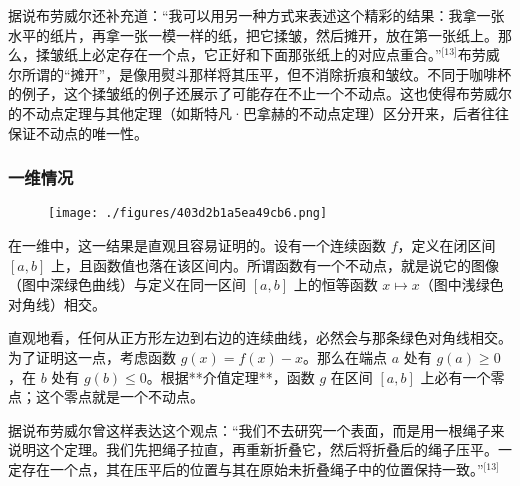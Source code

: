 据说布劳威尔还补充道：“我可以用另一种方式来表述这个精彩的结果：我拿一张水平的纸片，再拿一张一模一样的纸，把它揉皱，然后摊开，放在第一张纸上。那么，揉皱纸上必定存在一个点，它正好和下面那张纸上的对应点重合。”\(^\text{[13]}\)布劳威尔所谓的“摊开”，是像用熨斗那样将其压平，但不消除折痕和皱纹。不同于咖啡杯的例子，这个揉皱纸的例子还展示了可能存在不止一个不动点。这也使得布劳威尔的不动点定理与其他定理（如斯特凡·巴拿赫的不动点定理）区分开来，后者往往保证不动点的唯一性。
\subsubsection{一维情况}
\begin{figure}[ht]
\centering
\texttt{[image: ./figures/403d2b1a5ea49cb6.png]}
\caption{} \label{fig_BLWRbd_1}
\end{figure}
在一维中，这一结果是直观且容易证明的。设有一个连续函数 $f$，定义在闭区间 $[a, b]$ 上，且函数值也落在该区间内。所谓函数有一个不动点，就是说它的图像（图中深绿色曲线）与定义在同一区间 $[a, b]$ 上的恒等函数 $x \mapsto x$（图中浅绿色对角线）相交。

直观地看，任何从正方形左边到右边的连续曲线，必然会与那条绿色对角线相交。为了证明这一点，考虑函数 $g(x) = f(x) - x$。那么在端点 $a$ 处有 $g(a) \ge 0$，在 $b$ 处有 $g(b) \le 0$。根据**介值定理**，函数 $g$ 在区间 $[a, b]$ 上必有一个零点；这个零点就是一个不动点。

据说布劳威尔曾这样表达这个观点：“我们不去研究一个表面，而是用一根绳子来说明这个定理。我们先把绳子拉直，再重新折叠它，然后将折叠后的绳子压平。一定存在一个点，其在压平后的位置与其在原始未折叠绳子中的位置保持一致。”\(^\text{[13]}\)
